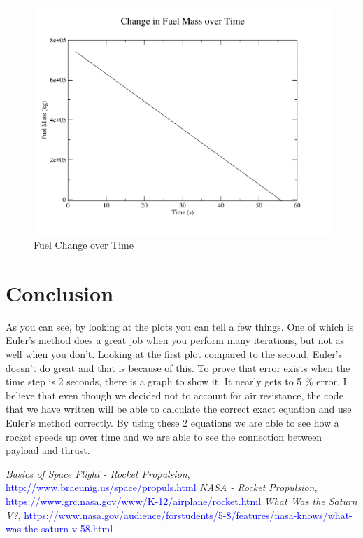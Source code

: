 \documentclass[11pt]{article}
\begin{document}
\begin{figure}[H]
\centering
\includegraphics[scale=0.45]{fuelMassChange.pdf}
\caption{Fuel Change over Time}
\end{figure}

\section{Conclusion}
As you can see, by looking at the plots you can tell a few things. One of which is Euler's method does a great job when you perform many iterations, but not as well when you don't. Looking at the first plot compared to the second, Euler's doesn't do great and that is because of this. To prove that error exists when the time step is 2 seconds, there is a graph to show it. It nearly gets to 5 \% error. I believe that even though we decided not to account for air resistance, the code that we have written will be able to calculate the correct exact equation and use Euler's method correctly. By using these 2 equations we are able to see how a rocket speeds up over time and we are able to see the connection between payload and thrust.

\newpage
\begin{thebibliography}{9}

		\textit{Basics of Space Flight - Rocket Propulsion}, \textcolor{blue}{http://www.braeunig.us/space/propuls.html}
		\textit{NASA - Rocket Propulsion}, \textcolor{blue}{https://www.grc.nasa.gov/www/K-12/airplane/rocket.html}
   	 	\textit{What Was the Saturn V?}, \textcolor{blue}{https://www.nasa.gov/audience/forstudents/5-8/features/nasa-knows/what-was-the-saturn-v-58.html}

\end{thebibliography}
\end{document}
